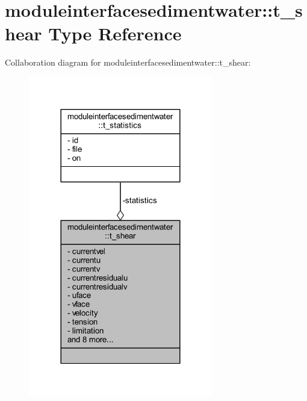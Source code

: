 \hypertarget{structmoduleinterfacesedimentwater_1_1t__shear}{}\section{moduleinterfacesedimentwater\+:\+:t\+\_\+shear Type Reference}
\label{structmoduleinterfacesedimentwater_1_1t__shear}


Collaboration diagram for moduleinterfacesedimentwater\+:\+:t\+\_\+shear\+:\nopagebreak
\begin{figure}[H]
\begin{center}
\leavevmode
\includegraphics[width=228pt]{structmoduleinterfacesedimentwater_1_1t__shear__coll__graph}
\end{center}
\end{figure}
